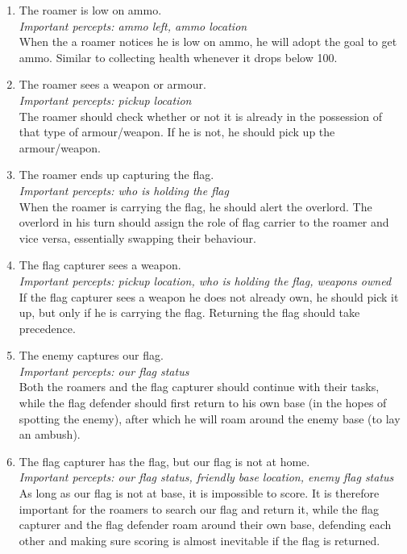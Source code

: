 \begin{enumerate}
	\item The roamer is low on ammo. \\
	\textit{Important percepts: ammo left, ammo location} \\
	When the a roamer notices he is low on ammo, he will adopt the goal to get ammo. Similar to collecting health whenever it drops below 100.\\
	\item The roamer sees a weapon or armour. \\
	\textit{Important percepts: pickup location} \\
	The roamer should check whether or not it is already in the possession of that type of armour/weapon. If he is not, he should pick up the armour/weapon.\\
	\item The roamer ends up capturing the flag. \\
	\textit{Important percepts: who is holding the flag} \\
	When the roamer is carrying the flag, he should alert the overlord. The overlord in his turn should assign the role of flag carrier to the roamer and vice versa, essentially swapping their behaviour.\\
	\item The flag capturer sees a weapon. \\
	\textit{Important percepts: pickup location, who is holding the flag, weapons owned} \\
	If the flag capturer sees a weapon he does not already own, he should pick it up, but only if he is carrying the flag. Returning the flag should take precedence.\\
	\item The enemy captures our flag. \\
	\textit{Important percepts: our flag status} \\
	Both the roamers and the flag capturer should continue with their tasks, while the flag defender should first return to his own base (in the hopes of spotting the enemy), after which he will roam around the enemy base (to lay an ambush). \\
	\item The flag capturer has the flag, but our flag is not at home. \\
	\textit{Important percepts: our flag status, friendly base location, enemy flag status} \\
	As long as our flag is not at base, it is impossible to score. It is therefore important for the roamers to search our flag and return it, while the flag capturer and the flag defender roam around their own base, defending each other and making sure scoring is almost inevitable if the flag is returned. \\
\end{enumerate}